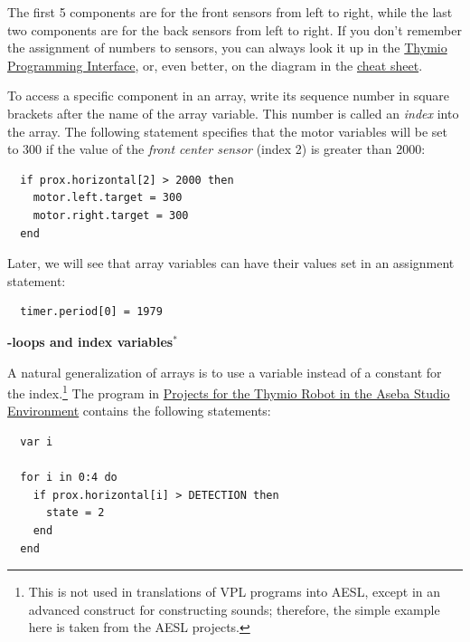 \documentclass[11pt,a4paper,english]{report}
\begin{document}
The first 5 components are for the front sensors from left to right,
while the last two components are for the back sensors from left to
right. If you don't remember the assignment of numbers to sensors, you
can always look it up in the
\href{https://aseba.wikidot.com/en:thymioapi}%
{Thymio Programming Interface}, or, even better, on the diagram in the
\href{https://aseba.wdfiles.com/local--files/en:thymioprogram/ThymioCheatSheet.pdf}%
{cheat sheet}.

To access a specific component in an array, write its sequence number in
square brackets after the name of the array variable. This number is
called an \emph{index} into the array. The following statement specifies
that the motor variables will be set to 300 if the value of the
\emph{front center sensor} (index 2) is greater than 2000:

\begin{footnotesize}
\begin{verbatim}
  if prox.horizontal[2] > 2000 then
    motor.left.target = 300
    motor.right.target = 300
  end
\end{verbatim}
\end{footnotesize}

Later, we will see that array variables can have their
values set in an assignment statement:
\begin{footnotesize}
\begin{verbatim}
  timer.period[0] = 1979
\end{verbatim}
\end{footnotesize}

\newpage

\textbf{\large {}-loops and index variables$^*$}

A natural generalization of arrays is to use a variable instead of a
constant for the index.\footnote{This is not used in translations of VPL
programs into AESL, except in an advanced construct for constructing
sounds; therefore, the simple example here is taken from the AESL
projects.} The program  in
\href{https://aseba.wdfiles.com/local--files/en:thymioprogram/thymio-programming-exercises-en.zip}%
{Projects for the Thymio Robot in the Aseba Studio Environment} contains
the following statements:

\begin{footnotesize}
\begin{verbatim}
  var i

  for i in 0:4 do
    if prox.horizontal[i] > DETECTION then
      state = 2
    end
  end
\end{verbatim}
\end{footnotesize}
\end{document}
